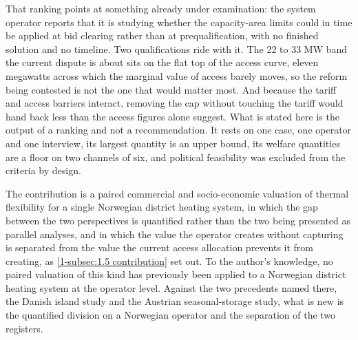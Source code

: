 That ranking points at something already under examination: the system operator reports that it is studying whether the capacity-area limits could in time be applied at bid clearing rather than at prequalification, with no finished solution and no timeline. Two qualifications ride with it. The 22 to 33 MW band the current dispute is about sits on the flat top of the access curve, eleven megawatts across which the marginal value of access barely moves, so the reform being contested is not the one that would matter most. And because the tariff and access barriers interact, removing the cap without touching the tariff would hand back less than the access figures alone suggest. What is stated here is the output of a ranking and not a recommendation. It rests on one case, one operator and one interview, its largest quantity is an upper bound, its welfare quantities are a floor on two channels of six, and political feasibility was excluded from the criteria by design.

The contribution is a paired commercial and socio-economic valuation of thermal flexibility for a single Norwegian district heating system, in which the gap between the two perspectives is quantified rather than the two being presented as parallel analyses, and in which the value the operator creates without capturing is separated from the value the current access allocation prevents it from creating, as \autoref{1-subsec:1.5 contribution} set out. To the author's knowledge, no paired valuation of this kind has previously been applied to a Norwegian district heating system at the operator level. Against the two precedents named there, the Danish island study and the Austrian seasonal-storage study, what is new is the quantified division on a Norwegian operator and the separation of the two registers.

